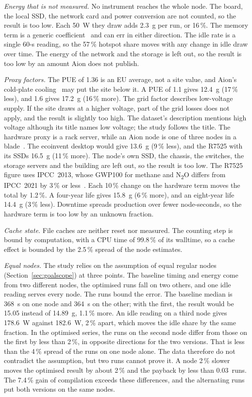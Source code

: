 \documentclass[conference,a4paper]{IEEEtran}
\begin{document}
\emph{Energy that is not measured.} No instrument reaches the whole node. The
board, the local SSD, the network card and power conversion are not counted, so
the result is too low. Each 50~W they draw adds 2.3~g per run, or 16\,\%. The
memory term is a generic coefficient~\cite{lannelongue2021} and can err in
either direction. The idle rate is a single 60-s reading, so the 57\,\% hotspot
share moves with any change in idle draw over time. The energy of the network
and the storage is left out, so the result is too low by an amount Aion does not
publish.

\emph{Proxy factors.} The PUE of 1.36 is an EU average, not a site value, and
Aion's cold-plate cooling~\cite{ulhpcaion} may put the site below it. A PUE of
1.1 gives 12.4~g (17\,\% less), and 1.6 gives 17.2~g (16\,\% more). The grid
factor describes low-voltage supply. If the site draws at a higher voltage, part
of the grid losses does not apply, and the result is slightly too high. The
dataset's description mentions high voltage although its title names low
voltage; the study follows the title. The hardware proxy is a rack server,
while an Aion node is one of three nodes in a blade~\cite{ulhpcaion}. The
ecoinvent desktop would give 13.6~g (9\,\% less), and the R7525 with its SSDs
16.5~g (11\,\% more). The node's own SSD, the chassis, the switches, the storage
servers and the building are left out, so the result is too low. The R7525
figure uses IPCC~2013, whose GWP100 for methane and N\textsubscript{2}O differs
from IPCC~2021 by 3\,\% or less~\cite{myhre2013,ipcc2021}. Each 10\,\% change on
the hardware term moves the total by 1.2\,\%. A four-year life gives 15.8~g
(6\,\% more), and an eight-year life 14.4~g (3\,\% less). Downtime spreads
production over fewer node-seconds, so the hardware term is too low by an
unknown fraction.

\emph{Cache state.} File caches are neither reset nor measured. The counting
step is bound by computation, with a CPU time of 99.8\,\% of its walltime, so a
cache effect is bounded by the 2.5\,\% spread of the node estimates.

\emph{Equal nodes.} The study relies on the assumption of equal regular nodes
(Section~\ref{sec:goalscope}) at three points. The baseline timing and energy
come from two different nodes, the optimised runs fall on two others, and one
idle reading serves every node. The runs bound the error. The baseline median
is 368~s on one node and 364~s on the other; with the first, the result would be
15.05 instead of 14.89~g, 1.1\,\% more. An idle reading on a third node gives
178.6~W against 182.6~W, 2\,\% apart, which moves the idle share by the same
fraction. In the optimised series, the runs on the second node differ from those
on the first by less than 2\,\%, in opposite directions for the two versions.
That is less than the 4\,\% spread of the runs on one node alone. The data
therefore do not contradict the assumption, but two runs cannot prove it. A node
2\,\% slower moves the optimised result by about 2\,\% and the payback by less
than 0.03~runs. The 7.4\,\% gain of compilation exceeds these differences, and
the alternating runs put both versions on the same nodes.
\end{document}

